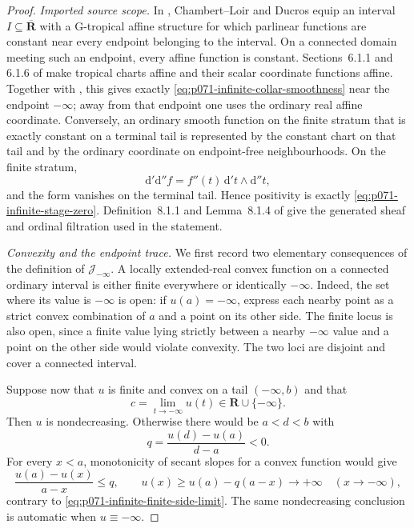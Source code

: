 
\begin{proof}
\medskip\noindent\emph{Imported source scope.}
In \cite[Example~6.7.2]{CLD25}, Chambert--Loir and Ducros equip an
interval \(I\subseteq\overline{\mathbf R}\) with a G-tropical affine
structure for which parlinear functions are constant near every endpoint
belonging to the interval.  On a connected domain meeting such an
endpoint, every affine function is constant.  Sections~6.1.1 and 6.1.6
of \cite{CLD25} make tropical charts affine and their scalar coordinate
functions affine.  Together with \cite[Definition~6.2.1]{CLD25}, this
gives exactly \eqref{eq:p071-infinite-collar-smoothness} near the endpoint
\(-\infty\); away from that endpoint one uses the ordinary real affine
coordinate.  Conversely, an ordinary smooth function on the finite
stratum that is exactly constant on a terminal tail is represented by
the constant chart on that tail and by the ordinary coordinate on
endpoint-free neighbourhoods.  On the finite stratum,
\[
 \mathrm d'\mathrm d''f
       =f''(t)\,\mathrm d't\wedge\mathrm d''t,
\]
and the form vanishes on the terminal tail.  Hence positivity is exactly
\eqref{eq:p071-infinite-stage-zero}.  Definition~8.1.1 and
Lemma~8.1.4 of \cite{CLD25} give the generated sheaf and ordinal
filtration used in the statement.

\medskip\noindent\emph{Convexity and the endpoint trace.}
We first record two elementary consequences of the definition of
\(\mathscr J_{-\infty}\).  A locally extended-real convex function on a
connected ordinary interval is either finite everywhere or identically
\(-\infty\).  Indeed, the set where its value is \(-\infty\) is open:
if \(u(a)=-\infty\), express each nearby point as a strict convex
combination of \(a\) and a point on its other side.  The finite locus is
also open, since a finite value lying strictly between a nearby
\(-\infty\) value and a point on the other side would violate convexity.
The two loci are disjoint and cover a connected interval.

Suppose now that \(u\) is finite and convex on a tail
\((-\infty,b)\) and that
\begin{equation}
             c=\lim_{t\to-\infty}u(t)
                    \in\mathbf R\cup\{-\infty\}.
 \label{eq:p071-infinite-finite-side-limit}
\end{equation}
Then \(u\) is nondecreasing.  Otherwise there would be \(a<d<b\) with
\[
                 q=\frac{u(d)-u(a)}{d-a}<0.
\]
For every \(x<a\), monotonicity of secant slopes for a convex function
would give
\[
       \frac{u(a)-u(x)}{a-x}\leq q,
       \qquad
       u(x)\geq u(a)-q(a-x)\longrightarrow+\infty
                    \quad(x\to-\infty),
\]
contrary to \eqref{eq:p071-infinite-finite-side-limit}.  The same
nondecreasing conclusion is automatic when \(u\equiv-\infty\).


\end{proof}
